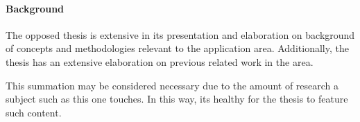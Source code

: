 
\paragraph{Background}
\label{par:background}
The opposed thesis is extensive in its presentation and elaboration on background of concepts and methodologies relevant to the application area.
Additionally, the thesis has an extensive elaboration on previous related work in the area.

This summation may be considered necessary due to the amount of research a subject such as this one touches.
In this way, its healthy for the thesis to feature such content.